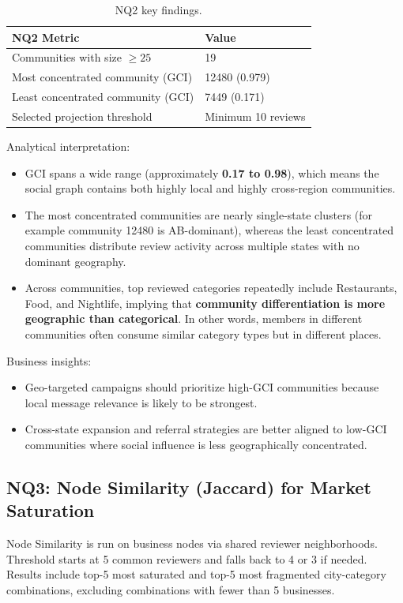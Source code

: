 \documentclass[11pt,a4paper]{article}
\begin{document}
\begin{table}[H]
\centering
\small
\begin{tabular}{ll}
\toprule
\textbf{NQ2 Metric} & \textbf{Value} \\
\midrule
Communities with size $\geq 25$ & 19 \\
Most concentrated community (GCI) & 12480 (0.979) \\
Least concentrated community (GCI) & 7449 (0.171) \\
Selected projection threshold & Minimum 10 reviews \\
\bottomrule
\end{tabular}
\caption{NQ2 key findings.}
\end{table}

Analytical interpretation:
\begin{itemize}
    \item GCI spans a wide range (approximately \textbf{0.17 to 0.98}), which means the social graph contains both highly local and highly cross-region communities.
    \item The most concentrated communities are nearly single-state clusters (for example community 12480 is AB-dominant), whereas the least concentrated communities distribute review activity across multiple states with no dominant geography.
    \item Across communities, top reviewed categories repeatedly include Restaurants, Food, and Nightlife, implying that \textbf{community differentiation is more geographic than categorical}. In other words, members in different communities often consume similar category types but in different places.
\end{itemize}

Business insights:
\begin{itemize}
    \item Geo-targeted campaigns should prioritize high-GCI communities because local message relevance is likely to be strongest.
    \item Cross-state expansion and referral strategies are better aligned to low-GCI communities where social influence is less geographically concentrated.
\end{itemize}

\subsection*{NQ3: Node Similarity (Jaccard) for Market Saturation}
Node Similarity is run on business nodes via shared reviewer neighborhoods. Threshold starts at 5 common reviewers and falls back to 4 or 3 if needed. Results include top-5 most saturated and top-5 most fragmented city-category combinations, excluding combinations with fewer than 5 businesses.
\end{document}
